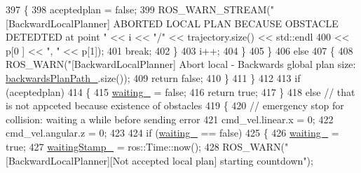 \begin{DoxyCode}
{{397                         \{
398                             aceptedplan = \textcolor{keyword}{false};
399                             ROS\_WARN\_STREAM(\textcolor{stringliteral}{"[BackwardLocalPlanner] ABORTED LOCAL PLAN BECAUSE OBSTACLE
       DETEDTED at point "} << i << \textcolor{stringliteral}{"/"} << trajectory.size() << std::endl
400                                                                                                      << p[0
      ] << \textcolor{stringliteral}{", "} << p[1]);
401                             \textcolor{keywordflow}{break};
402                         \}
403                         i++;
404                     \}
405                 \}
406                 \textcolor{keywordflow}{else}
407                 \{
408                     ROS\_WARN(\textcolor{stringliteral}{"[BackwardLocalPlanner] Abort local - Backwards global plan size: %
      \hyperlink{classcl__move__base__z_1_1backward__local__planner_1_1BackwardLocalPlanner_ad9cde5c85f782cab2ddb4030e3c3f2cf}{backwardsPlanPath\_}.size());
409                     \textcolor{keywordflow}{return} \textcolor{keyword}{false};
410                 \}
411             \}
412 
413             \textcolor{keywordflow}{if} (aceptedplan)
414             \{
415                 \hyperlink{classcl__move__base__z_1_1backward__local__planner_1_1BackwardLocalPlanner_a00849266e4bdd9379c3717e8a41c303e}{waiting\_} = \textcolor{keyword}{false};
416                 \textcolor{keywordflow}{return} \textcolor{keyword}{true};
417             \}
418             \textcolor{keywordflow}{else} \textcolor{comment}{// that is not appceted because existence of obstacles}
419             \{
420                 \textcolor{comment}{// emergency stop for collision: waiting a while before sending error}
421                 cmd\_vel.linear.x = 0;
422                 cmd\_vel.angular.z = 0;
423 
424                 \textcolor{keywordflow}{if} (\hyperlink{classcl__move__base__z_1_1backward__local__planner_1_1BackwardLocalPlanner_a00849266e4bdd9379c3717e8a41c303e}{waiting\_} == \textcolor{keyword}{false})
425                 \{
426                     \hyperlink{classcl__move__base__z_1_1backward__local__planner_1_1BackwardLocalPlanner_a00849266e4bdd9379c3717e8a41c303e}{waiting\_} = \textcolor{keyword}{true};
427                     \hyperlink{classcl__move__base__z_1_1backward__local__planner_1_1BackwardLocalPlanner_abe08faab5b784fcf64ac6b3f936459f1}{waitingStamp\_} = ros::Time::now();
428                     ROS\_WARN(\textcolor{stringliteral}{"[BackwardLocalPlanner][Not accepted local plan] starting countdown"});
}}}
\end{DoxyCode}
